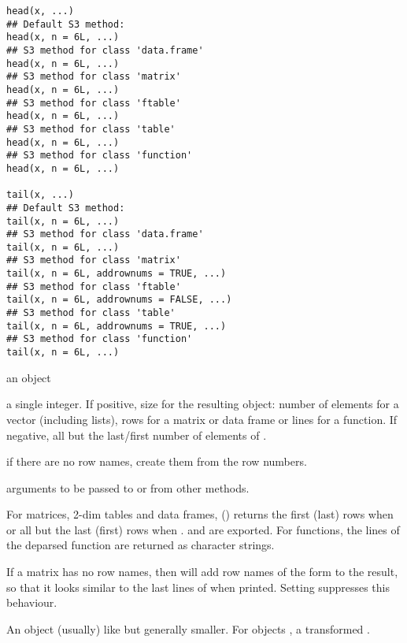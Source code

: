 %
\begin{Usage}
\begin{verbatim}
head(x, ...)
## Default S3 method:
head(x, n = 6L, ...)
## S3 method for class 'data.frame'
head(x, n = 6L, ...)
## S3 method for class 'matrix'
head(x, n = 6L, ...)
## S3 method for class 'ftable'
head(x, n = 6L, ...)
## S3 method for class 'table'
head(x, n = 6L, ...)
## S3 method for class 'function'
head(x, n = 6L, ...)

tail(x, ...)
## Default S3 method:
tail(x, n = 6L, ...)
## S3 method for class 'data.frame'
tail(x, n = 6L, ...)
## S3 method for class 'matrix'
tail(x, n = 6L, addrownums = TRUE, ...)
## S3 method for class 'ftable'
tail(x, n = 6L, addrownums = FALSE, ...)
## S3 method for class 'table'
tail(x, n = 6L, addrownums = TRUE, ...)
## S3 method for class 'function'
tail(x, n = 6L, ...)
\end{verbatim}
\end{Usage}
%
\begin{Arguments}
\begin{ldescription}
\item[\code{x}] an object
\item[\code{n}] a single integer. If positive, size for the resulting
object: number of elements for a vector (including lists), rows for
a matrix or data frame or lines for a function. If negative, all but
the  last/first number of elements of .
\item[\code{addrownums}] if there are no row names, create them from the row
numbers.
\item[\code{...}] arguments to be passed to or from other methods.
\end{ldescription}
\end{Arguments}
%
\begin{Details}\relax
For matrices, 2-dim tables and data frames,  () returns
the first (last)  rows when  or all but the
last (first)  rows when .   and
 are exported.  For functions, the
lines of the deparsed function are returned as character strings.

If a matrix has no row names, then  will add row names of
the form  to the result, so that it looks similar to the
last lines of  when printed.  Setting  suppresses this behaviour.
\end{Details}
%
\begin{Value}
An object (usually) like  but generally smaller.  For
 objects , a transformed .
\end{Value}
